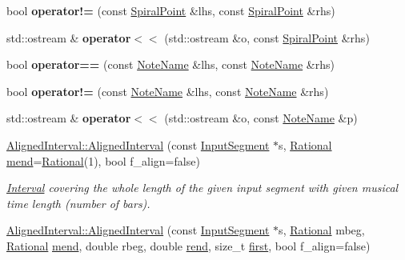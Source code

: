 \begin{DoxyCompactItemize}
\item 
\mbox{\label{group__segment_ga0b4ffecf00942ad046a9ea6785319f6f}} 
bool {\bfseries operator!=} (const \mbox{\hyperlink{structSpiralPoint}{Spiral\+Point}} \&lhs, const \mbox{\hyperlink{structSpiralPoint}{Spiral\+Point}} \&rhs)
\item 
\mbox{\label{group__segment_gab3a698d42f743ce361da6916209eca88}} 
std\+::ostream \& {\bfseries operator$<$$<$} (std\+::ostream \&o, const \mbox{\hyperlink{structSpiralPoint}{Spiral\+Point}} \&rhs)
\item 
\mbox{\label{group__segment_gaeba3d7c6ab7481a52f2cd4ce980c08ca}} 
bool {\bfseries operator==} (const \mbox{\hyperlink{structNoteName}{Note\+Name}} \&lhs, const \mbox{\hyperlink{structNoteName}{Note\+Name}} \&rhs)
\item 
\mbox{\label{group__segment_ga7c5e53ea6aa75682a2320bdf2f6f17fa}} 
bool {\bfseries operator!=} (const \mbox{\hyperlink{structNoteName}{Note\+Name}} \&lhs, const \mbox{\hyperlink{structNoteName}{Note\+Name}} \&rhs)
\item 
\mbox{\label{group__segment_ga696a465764983bfca52bcd6406e373f9}} 
std\+::ostream \& {\bfseries operator$<$$<$} (std\+::ostream \&o, const \mbox{\hyperlink{structNoteName}{Note\+Name}} \&p)
\item 
\mbox{\hyperlink{group__segment_ga7e9399ce64bb21aa2d2c3cd682ca95da}{Aligned\+Interval\+::\+Aligned\+Interval}} (const \mbox{\hyperlink{classInputSegment}{Input\+Segment}} $\ast$s, \mbox{\hyperlink{classRational}{Rational}} \mbox{\hyperlink{classInterval_a963b9b36f085a7db9c159c55608f8408}{mend}}=\mbox{\hyperlink{classRational}{Rational}}(1), bool f\+\_\+align=false)
\begin{DoxyCompactList}\small\item\em \mbox{\hyperlink{classInterval}{Interval}} covering the whole length of the given input segment with given musical time length (number of bars). \end{DoxyCompactList}\item 
\mbox{\hyperlink{group__segment_ga4aa5548293e2dcd94ab3845d9a8fe492}{Aligned\+Interval\+::\+Aligned\+Interval}} (const \mbox{\hyperlink{classInputSegment}{Input\+Segment}} $\ast$s, \mbox{\hyperlink{classRational}{Rational}} mbeg, \mbox{\hyperlink{classRational}{Rational}} \mbox{\hyperlink{classInterval_a963b9b36f085a7db9c159c55608f8408}{mend}}, double rbeg, double \mbox{\hyperlink{classInterval_a1acb3128311a318b23e68cc8ca0182e9}{rend}}, size\+\_\+t \mbox{\hyperlink{classAlignedInterval_a1660736ae6e829e6c92616e49784a583}{first}}, bool f\+\_\+align=false)

\end{DoxyCompactItemize}
